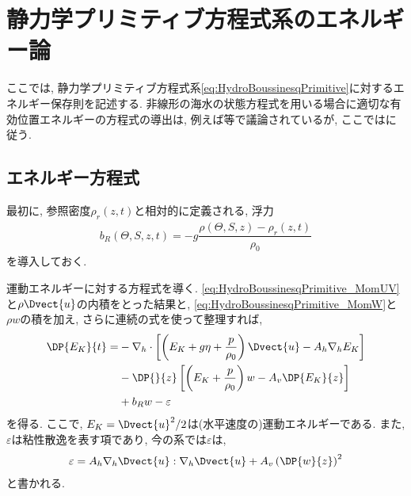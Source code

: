 \section{静力学プリミティブ方程式系のエネルギー論}
ここでは, 静力学プリミティブ方程式系\eqref{eq:HydroBoussinesqPrimitive}に対するエネルギー保存則を記述する.
非線形の海水の状態方程式を用いる場合に適切な有効位置エネルギーの方程式の導出は,  
例えば\cite{vallis2006atmospheric,young2010dynamic,roquet2013dynamical,tailleux2013available}等で議論されているが,  
ここでは\cite{tailleux2013available}に従う. 

\subsection{エネルギー方程式}
最初に, 参照密度$\rho_r(z,t)$と相対的に定義される, 浮力
\begin{align}
  b_R(\Theta,S,z,t) = - g\dfrac{\rho(\Theta,S,z) - \rho_r(z,t)}{\rho_0}
\end{align}
を導入しておく.

運動エネルギーに対する方程式を導く.
\eqref{eq:HydroBoussinesqPrimitive_MomUV}と$\rho \Dvect{u}$の内積をとった結果と,
\eqref{eq:HydroBoussinesqPrimitive_MomW}と$\rho w$の積を加え,
さらに連続の式を使って整理すれば, 
\begin{align}
    \DP{E_K}{t}
 =
  &-  \nabla_h \cdot \left[\left( E_K + g\eta + \dfrac{p}{\rho_0}  \right) \Dvect{u} - A_h \nabla_h E_K \right] \nonumber \\
  &-  \DP{}{z} \left[\left( E_K + \dfrac{p}{\rho_0} \right) w - A_v \DP{E_K}{z} \right]                         \nonumber \\
  &+  b_R w
   - \varepsilon
\label{eq:BoussinesqEnergetics_KE}
\end{align}
を得る.
ここで, $E_K=\Dvect{u}^2/2$は(水平速度の)運動エネルギーである.
また, $\varepsilon$は粘性散逸を表す項であり, 今の系では$\varepsilon$は, 
\begin{align}
 \varepsilon
 =   A_h \nabla_h \Dvect{u} : \nabla_h \Dvect{u}
   + A_v \left(\DP{w}{z}\right)^2
\end{align}
と書かれる.

